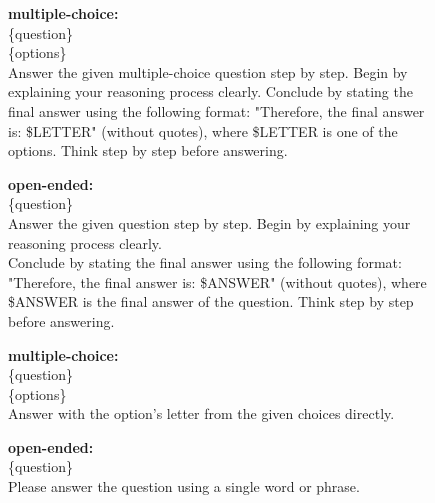 \documentclass{llmxive}
\providecommand{\eval}{VideoKR-Eval\xspace}
\begin{document}
\begin{figure}[h]
\begin{tcolorbox}[colback=black!7.5!white, colframe=black!80!white, title={\eval -- For Qwen series thinking models, GPT-5.4, Gemini 3 Pro, Claude Opus 4.5 and InternVL3.5-8B}, fontupper=\footnotesize, fontlower=\footnotesize, fonttitle=\footnotesize]

\textbf{multiple-choice:}\\
\{question\}\\
\{options\}\\
Answer the given multiple-choice question step by step. Begin by explaining your
reasoning process clearly. Conclude by stating the final answer using the following
format: "Therefore, the final answer is: \$LETTER" (without quotes), where \$LETTER is one of the options. Think step by step before answering.

\tcblower
\textbf{open-ended:}\\
\{question\}\\
Answer the given question step by step. Begin by explaining your reasoning process
clearly.\\
Conclude by stating the final answer using the following format: "Therefore, the final answer is: \$ANSWER" (without quotes), where \$ANSWER is the final answer of the question. Think step by step before answering.

\end{tcolorbox}
\end{figure}


\begin{figure}[h]
\begin{tcolorbox}[colback=black!7.5!white, colframe=black!80!white, title=\eval -- For Qwen series instruct models and other models, fontupper=\footnotesize, fontlower=\footnotesize, fonttitle=\footnotesize]

\textbf{multiple-choice:}\\
\{question\}\\
\{options\}\\
Answer with the option’s letter from the given choices directly.

\tcblower
\textbf{open-ended:}\\
\{question\}\\
Please answer the question using a single word or phrase.

\end{tcolorbox}
\end{figure}
\end{document}
